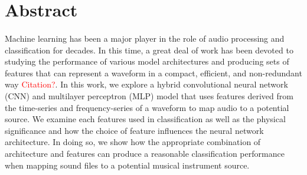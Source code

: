 \documentclass[12pt,letterpaper]{article}
\begin{document}

\section{Abstract}

\paragraph*{}Machine learning has been a major player in the role of audio processing and classification for decades. In this time, a great deal of work has been devoted to studying the performance of various model architectures and producing sets of features that can represent a waveform in a compact, efficient, and non-redundant way \textcolor{red}{Citation?}. In this work, we explore a hybrid convolutional neural network (CNN) and multilayer perceptron (MLP) model that uses  features derived from the time-series and frequency-series of a waveform to map audio to a potential source. We examine each features used in classification as well as the physical significance and how the choice of feature influences the neural network architecture. In doing so, we show how the appropriate combination of architecture and features can produce a reasonable classification performance when mapping sound files to a potential musical instrument source.

\end{document}
